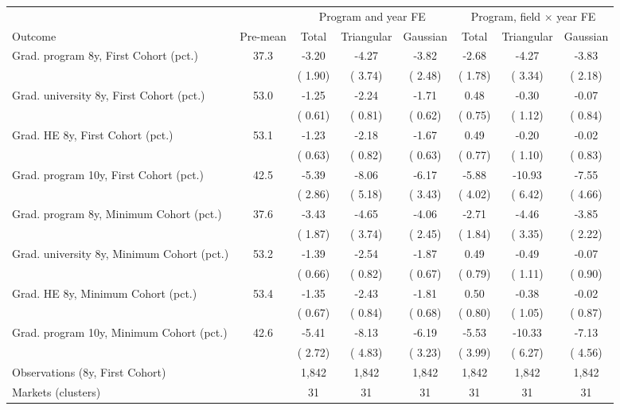 \begin{tabular}{lccccccc}
\toprule
 & & \multicolumn{3}{c}{Program and year FE} & \multicolumn{3}{c}{Program, field \(\times\) year FE} \\
\cmidrule(lr){3-5}\cmidrule(lr){6-8}
Outcome & Pre-mean & Total & Triangular & Gaussian & Total & Triangular & Gaussian \\
\midrule
Grad. program 8y, First Cohort (pct.) &  37.3 &  -3.20 &  -4.27 &  -3.82 &  -2.68 &  -4.27 &  -3.83\sym{*} \\
 &  & ( 1.90) & ( 3.74) & ( 2.48) & ( 1.78) & ( 3.34) & ( 2.18) \\
Grad. university 8y, First Cohort (pct.) &  53.0 &  -1.25\sym{*} &  -2.24\sym{***} &  -1.71\sym{***} &   0.48 &  -0.30 &  -0.07 \\
 &  & ( 0.61) & ( 0.81) & ( 0.62) & ( 0.75) & ( 1.12) & ( 0.84) \\
Grad. HE 8y, First Cohort (pct.) &  53.1 &  -1.23\sym{*} &  -2.18\sym{**} &  -1.67\sym{**} &   0.49 &  -0.20 &  -0.02 \\
 &  & ( 0.63) & ( 0.82) & ( 0.63) & ( 0.77) & ( 1.10) & ( 0.83) \\
Grad. program 10y, First Cohort (pct.) &  42.5 &  -5.39\sym{*} &  -8.06 &  -6.17\sym{*} &  -5.88 & -10.93\sym{*} &  -7.55 \\
 &  & ( 2.86) & ( 5.18) & ( 3.43) & ( 4.02) & ( 6.42) & ( 4.66) \\
\addlinespace
Grad. program 8y, Minimum Cohort (pct.) &  37.6 &  -3.43\sym{*} &  -4.65 &  -4.06 &  -2.71 &  -4.46 &  -3.85\sym{*} \\
 &  & ( 1.87) & ( 3.74) & ( 2.45) & ( 1.84) & ( 3.35) & ( 2.22) \\
Grad. university 8y, Minimum Cohort (pct.) &  53.2 &  -1.39\sym{**} &  -2.54\sym{***} &  -1.87\sym{***} &   0.49 &  -0.49 &  -0.07 \\
 &  & ( 0.66) & ( 0.82) & ( 0.67) & ( 0.79) & ( 1.11) & ( 0.90) \\
Grad. HE 8y, Minimum Cohort (pct.) &  53.4 &  -1.35\sym{*} &  -2.43\sym{***} &  -1.81\sym{**} &   0.50 &  -0.38 &  -0.02 \\
 &  & ( 0.67) & ( 0.84) & ( 0.68) & ( 0.80) & ( 1.05) & ( 0.87) \\
Grad. program 10y, Minimum Cohort (pct.) &  42.6 &  -5.41\sym{*} &  -8.13 &  -6.19\sym{*} &  -5.53 & -10.33 &  -7.13 \\
 &  & ( 2.72) & ( 4.83) & ( 3.23) & ( 3.99) & ( 6.27) & ( 4.56) \\
\midrule
Observations (8y, First Cohort) &  &  1,842 &  1,842 &  1,842 &  1,842 &  1,842 &  1,842 \\
Markets (clusters) &  &   31 &   31 &   31 &   31 &   31 &   31 \\
\bottomrule
\end{tabular}
